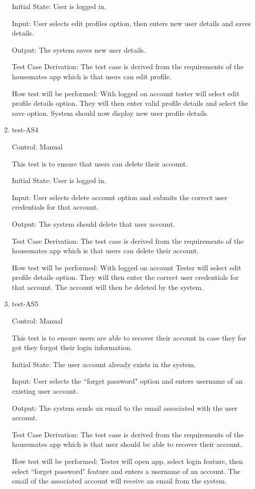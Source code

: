 \documentclass[12pt, titlepage]{article}
\begin{document}
\begin{enumerate}
Initial State: User is logged in.
					
Input: User selects edit profiles option, then enters new user details and saves details.
					
Output: The system saves new user details.

Test Case Derivation: The test case is derived from the requirements of the housemates app which is that users can edit profile.

How test will be performed: With logged on account tester will select edit profile details option. They will then enter valid profile details and select the save option. System should now display new user profile details.

\item{test-AS4\\}

Control: Manual

This test is to ensure that users can delete their account.

Initial State: User is logged in.
					
Input: User selects delete account option and submits the correct user credentials for that account.
					
Output: The system should delete that user account.

Test Case Derivation: The test case is derived from the requirements of the housemates app which is that users can delete their account.

How test will be performed: With logged on account Tester will select edit profile details option. They will then enter the correct user credentials for that account. The account will then be deleted by the system.



\item{test-AS5\\}

Control: Manual


This test is to ensure users are able to recover their account in case they for got they forgot their login information.

Initial State: The user account already exists in the system.
					
Input: User selects the ``forget password" option and enters username of an existing user account.
					
Output: The system sends an email to the email associated with the user account.

Test Case Derivation: The test case is derived from the requirements of the housemates app which is that user should be able to recover their account.

How test will be performed: Tester will open app, select login feature, then select ``forget password" feature and enters a username of an account. The email of the associated account will receive an email from the system.

\end{enumerate}
\end{document}
